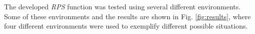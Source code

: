 \documentclass[journal]{IEEEtran}
\begin{document}
The developed \textit{RPS} function was tested using several different environments. Some of these environments and the results are shown in Fig. \ref{fig:results}, where four different environments were used to exemplify different possible situations.

\begin{figure}[p]
	\centering
	~
	\\
	
	~
	\\
	

\end{figure}
\end{document}
